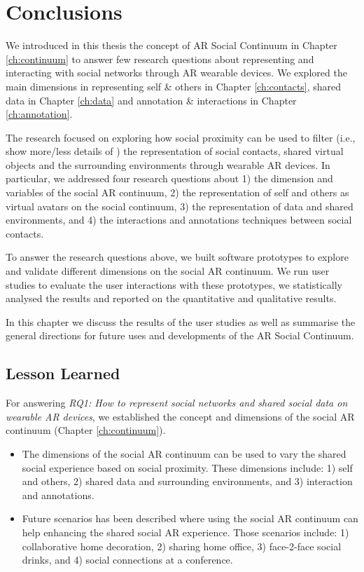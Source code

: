 \chapter{Conclusions}
\label{ch:conclusions}

We introduced in this thesis the concept of AR Social Continuum in Chapter \ref{ch:continuum} to answer few research questions about representing and interacting with social networks through AR wearable devices. We explored the main dimensions in representing self \& others in Chapter \ref{ch:contacts}, shared data in Chapter \ref{ch:data} and annotation \& interactions in Chapter \ref{ch:annotation}. 

The research focused on exploring how social proximity can be used to filter (i.e., show more/less details of ) the representation of social contacts, shared virtual objects and the surrounding environments through wearable AR devices. In particular, we addressed four research questions about 1) the dimension and variables of the social AR continuum, 2) the representation of self and others as virtual avatars on the social continuum, 3) the representation of data and shared environments, and 4) the interactions and annotations techniques between social contacts.   

To answer the research questions above, we built software prototypes to explore and validate different dimensions on the social AR continuum. We run user studies to evaluate the user interactions with these prototypes, we statistically analysed the results and reported on the quantitative and qualitative results. 

In this chapter we discuss the results of the user studies as well as summarise the general directions for future uses and developments of the AR Social Continuum. 

\pagebreak

\section{Lesson Learned}

For answering \textit{RQ1: How to represent social networks and shared social data on wearable AR devices}, we established the concept and dimensions of the social AR continuum (Chapter \ref{ch:continuum}).

\begin{itemize}
    \item{The dimensions of the social AR continuum can be used to vary the shared social experience based on social proximity. These dimensions include: 1) self and others, 2) shared data and surrounding environments, and 3) interaction and annotations.}
    \item{Future scenarios has been described where using the social AR continuum can help enhancing the shared social AR experience. Those scenarios include: 1) collaborative home decoration, 2) sharing home office, 3) face-2-face social drinks, and 4) social connections at a conference.}
\end{itemize}

